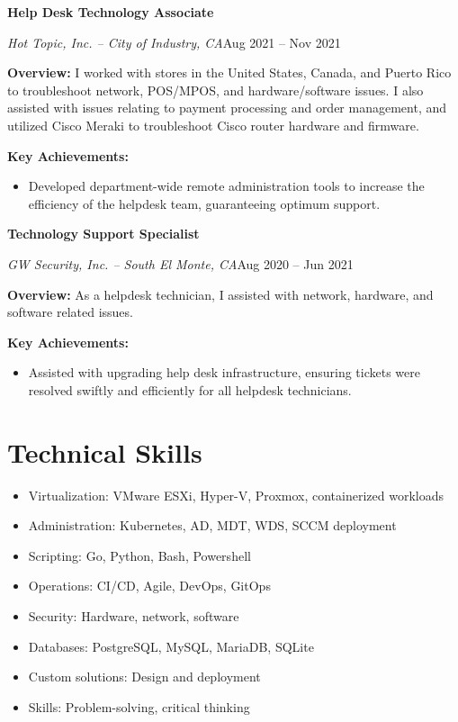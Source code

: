 \documentclass[a4paper]{article}
\begin{document}
\vspace{10pt}
\begin{minipage}{\textwidth}
\textbf{Help Desk Technology Associate}\par
\textit{Hot Topic, Inc. -- City of Industry, CA}\hfill Aug 2021 -- Nov 2021

\medskip
\textbf{Overview:} I worked with stores in the United States, Canada, and Puerto Rico to troubleshoot network, POS/MPOS, and hardware/software issues. I also assisted with issues relating to payment processing and order management, and utilized Cisco Meraki to troubleshoot Cisco router hardware and firmware.

\medskip
\textbf{Key Achievements:}
\begin{itemize}
    \item Developed department-wide remote administration tools to increase the efficiency of the helpdesk team, guaranteeing optimum support.
\end{itemize}
\end{minipage}

\vspace{10pt}
\begin{minipage}{\textwidth}
\textbf{Technology Support Specialist}\par
\textit{GW Security, Inc. -- South El Monte, CA}\hfill Aug 2020 -- Jun 2021

\medskip
\textbf{Overview:} As a helpdesk technician, I assisted with network, hardware, and software related issues.

\medskip
\textbf{Key Achievements:}
\begin{itemize}
    \item Assisted with upgrading help desk infrastructure, ensuring tickets were resolved swiftly and efficiently for all helpdesk technicians.
\end{itemize}
\end{minipage}

\section{Technical Skills}
\begin{minipage}{\textwidth}
\begin{itemize}
    \item Virtualization: VMware ESXi, Hyper-V, Proxmox, containerized workloads
    \item Administration: Kubernetes, AD, MDT, WDS, SCCM deployment
    \item Scripting: Go, Python, Bash, Powershell
    \item Operations: CI/CD, Agile, DevOps, GitOps
    \item Security: Hardware, network, software
    \item Databases: PostgreSQL, MySQL, MariaDB, SQLite
    \item Custom solutions: Design and deployment
    \item Skills: Problem-solving, critical thinking
\end{itemize}
\end{minipage}
\end{document}
